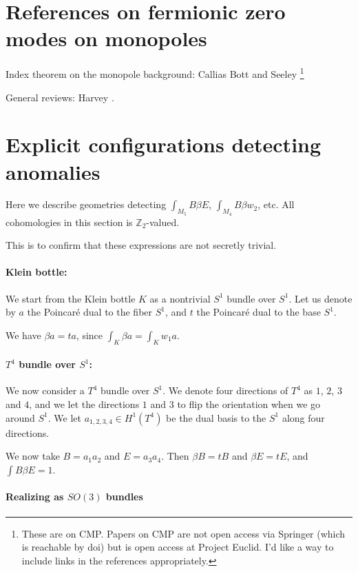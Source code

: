 \documentclass[12pt]{article}
\numberwithin{equation}{section}
\def\bZ{\mathbb{Z}}
\begin{document}
\section{References on fermionic zero modes on monopoles}

Index theorem on the monopole background: 
Callias \cite{Callias:1977kg} Bott and Seeley \cite{Bott:1978bw}\footnote{%
These are on CMP. 
Papers on CMP are not open access via Springer (which is reachable by doi) but is open access at Project Euclid. 
I'd like a way to include links in the references appropriately.
}

General reviews: Harvey \cite[Lecture 4]{Harvey:1996ur}.


\section{Explicit configurations detecting anomalies}

Here we describe geometries detecting $\int_{M_5} B\beta E$, $\int_{M_4} B\beta w_2$, etc.
All cohomologies in this section is $\bZ_2$-valued.

This is to confirm that these expressions are not secretly trivial.

\paragraph{Klein bottle:}

We start from the Klein bottle $K$ as a nontrivial $S^1$ bundle over $S^1$.
Let us denote by $a$ the Poincar\'e dual to the fiber $S^1$,
and $t$ the Poincar\'e dual to the base $S^1$.

We have $\beta a=ta$, since $\int_K \beta a = \int_K w_1 a$.

\paragraph{$T^4$ bundle over $S^1$:}

We now consider a $T^4$ bundle over $S^1$. 
We denote four directions of $T^4$ as $1$, $2$, $3$ and $4$,
and we let the directions $1$ and $3$ to flip the orientation when we go around $S^1$.
We let $a_{1,2,3,4}\in H^1(T^4)$ be the dual basis to the $S^1$ along four directions.

We now take $B=a_1a_2$ and $E=a_3 a_4$.
Then $\beta B=tB$ and $\beta E=tE$, and $\int B\beta E=1$.

\paragraph{Realizing as $SO(3)$ bundles}
\end{document}
